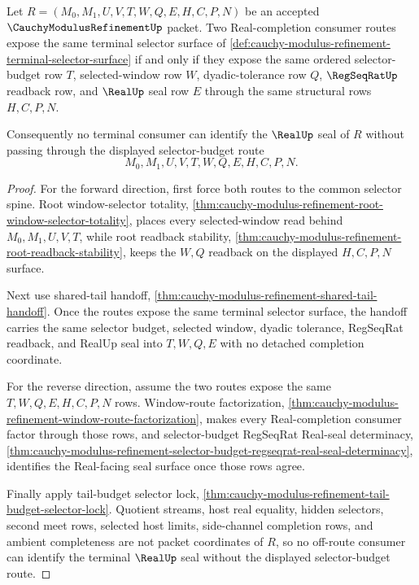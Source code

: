\begin{theorem}
\label{thm:cauchy-modulus-refinement-terminal-selector-seal-correspondence}
Let $R=(M_0,M_1,U,V,T,W,Q,E,H,C,P,N)$ be an accepted $\CauchyModulusRefinementUp$ packet. Two Real-completion consumer routes expose the same terminal selector surface of \autoref{def:cauchy-modulus-refinement-terminal-selector-surface} if and only if they expose the same ordered selector-budget row $T$, selected-window row $W$, dyadic-tolerance row $Q$, $\RegSeqRatUp$ readback row, and $\RealUp$ seal row $E$ through the same structural rows $H,C,P,N$.

Consequently no terminal consumer can identify the $\RealUp$ seal of $R$ without passing through the displayed selector-budget route
$$
M_0,M_1,U,V,T,W,Q,E,H,C,P,N.
$$
\end{theorem}
\begin{proof}
For the forward direction, first force both routes to the common selector spine. Root window-selector totality, \autoref{thm:cauchy-modulus-refinement-root-window-selector-totality}, places every selected-window read behind $M_0,M_1,U,V,T$, while root readback stability, \autoref{thm:cauchy-modulus-refinement-root-readback-stability}, keeps the $W,Q$ readback on the displayed $H,C,P,N$ surface.

Next use shared-tail handoff, \autoref{thm:cauchy-modulus-refinement-shared-tail-handoff}. Once the routes expose the same terminal selector surface, the handoff carries the same selector budget, selected window, dyadic tolerance, RegSeqRat readback, and RealUp seal into $T,W,Q,E$ with no detached completion coordinate.

For the reverse direction, assume the two routes expose the same $T,W,Q,E,H,C,P,N$ rows. Window-route factorization, \autoref{thm:cauchy-modulus-refinement-window-route-factorization}, makes every Real-completion consumer factor through those rows, and selector-budget RegSeqRat Real-seal determinacy, \autoref{thm:cauchy-modulus-refinement-selector-budget-regseqrat-real-seal-determinacy}, identifies the Real-facing seal surface once those rows agree.

Finally apply tail-budget selector lock, \autoref{thm:cauchy-modulus-refinement-tail-budget-selector-lock}. Quotient streams, host real equality, hidden selectors, second meet rows, selected host limits, side-channel completion rows, and ambient completeness are not packet coordinates of $R$, so no off-route consumer can identify the terminal $\RealUp$ seal without the displayed selector-budget route.
\end{proof}

